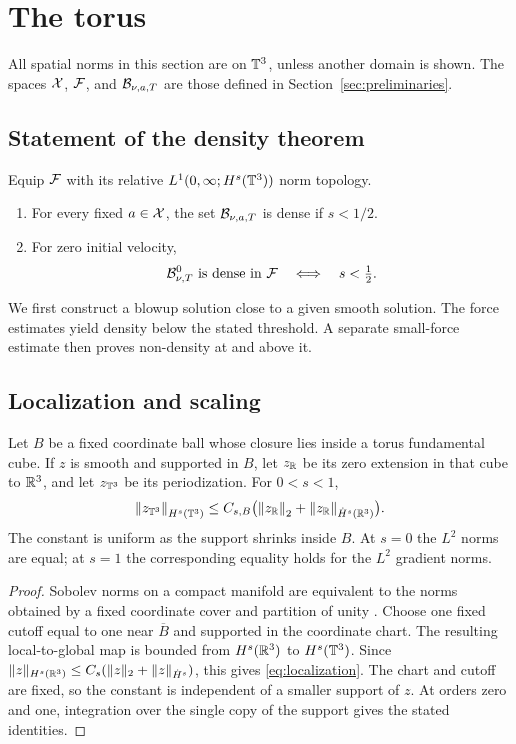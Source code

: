 \section{The torus}\label{sec:torus}
All spatial norms in this section are on $\mathbb T^3$, unless another domain is
shown. The spaces $\mathcal X$, $\mathcal F$, and $\mathcal B_{\nu,a,T}$ are those defined in
Section~\ref{sec:preliminaries}.
\subsection{Statement of the density theorem}
\begin{theorem}\label{thm:main}
Equip $\mathcal F$ with its relative $L^1(0,\infty;H^s(\mathbb T^3))$ norm topology.
\begin{enumerate}[label=(\roman*),nosep]
\item For every fixed $a\in\mathcal X$, the set $\mathcal B_{\nu,a,T}$ is dense if $s<1/2$.
\item For zero initial velocity,
\[
 \mathcal B^0_{\nu,T}\text{ is dense in }\mathcal F
 \quad\Longleftrightarrow\quad s<\tfrac12.
\]
\end{enumerate}
\end{theorem}

We first construct a blowup solution close to a given smooth solution. The
force estimates yield density below the stated threshold. A separate
small-force estimate then proves non-density at and above it.
\subsection{Localization and scaling}\label{sec:packet}
\begin{lemma}\label{lem:localization}
Let $B$ be a fixed coordinate ball whose closure lies inside a torus fundamental cube. If $z$ is smooth and supported in $B$, let $z_{\mathbb R}$ be its zero extension in that cube to $\mathbb R^3$, and let $z_{\mathbb T^3}$ be its periodization. For $0<s<1$,
\begin{equation}\label{eq:localization}
 \left\lVert z_{\mathbb T^3}\right\rVert_{H^s(\mathbb T^3)}
 \le C_{s,B}\bigl(\left\lVert z_{\mathbb R}\right\rVert_2+
                   \left\lVert z_{\mathbb R}\right\rVert_{\dot H^s(\mathbb R^3)}\bigr).
\end{equation}
The constant is uniform as the support shrinks inside $B$. At $s=0$ the $L^2$ norms are equal; at $s=1$ the corresponding equality holds for the $L^2$ gradient norms.
\end{lemma}
\begin{proof}
Sobolev norms on a compact manifold are equivalent to the norms obtained
by a fixed coordinate cover and partition of unity
\cite[Chapter~4, Sections~2--3]{taylor2011}. Choose one fixed cutoff equal
to one near $\overline B$ and supported in the coordinate chart. The resulting
local-to-global map is bounded from $H^s(\mathbb R^3)$ to $H^s(\mathbb T^3)$.
Since $\|z\|_{H^s(\mathbb R^3)}\le C_s(\|z\|_2+\|z\|_{\dot H^s})$,
this gives \eqref{eq:localization}. The chart and cutoff are fixed, so the
constant is independent of a smaller support of $z$. At orders zero and
one, integration over the single copy of the support gives the stated identities.
\end{proof}

